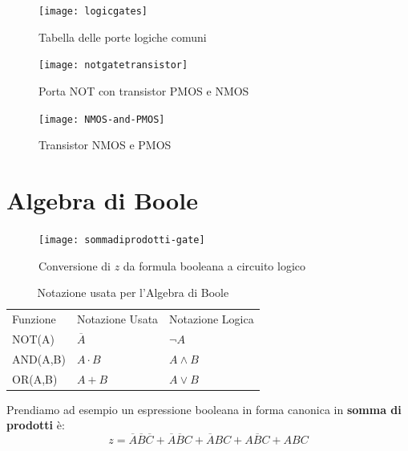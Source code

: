 \begin{figure}
	\centering
	\caption{Tabella delle porte logiche comuni}
	\texttt{[image: logicgates]}
\end{figure}

\begin{figure}
	\centering
	\caption{Porta NOT con transistor PMOS e NMOS}
	\texttt{[image: notgatetransistor]}
\end{figure}

\begin{figure}
	\centering
	\caption{Transistor NMOS e PMOS}
	\texttt{[image: NMOS-and-PMOS]}
\end{figure}

\clearpage

\section{Algebra di Boole}


\begin{figure}[H]
	\centering
	\texttt{[image: sommadiprodotti-gate]}
	\caption{Conversione di $ z $ da formula booleana a circuito logico}
\end{figure}

\begin{table}[H]
	\centering
	\caption{Notazione usata per l'Algebra di Boole}
	\label{tab:notazione-booleana}
	\begin{tabular}{|l|l|l|}
		\hline
		Funzione & Notazione Usata & Notazione Logica \\ 
		NOT(A)   & $\overbar{A}$   & $\lnot A$        \\ 
		AND(A,B) & $A \cdot B$     & $A \land B$      \\ 
		OR(A,B)  & $A + B$         & $A \lor B$       \\ \hline
	\end{tabular}
\end{table}

Prendiamo ad esempio un espressione booleana in forma canonica in \textbf{somma di prodotti} è:
\[ z = \overbar{A}\overbar{B}\overbar{C} + \overbar{A}\overbar{B}C + \overbar{A}BC + A\overbar{B}C + ABC \]


